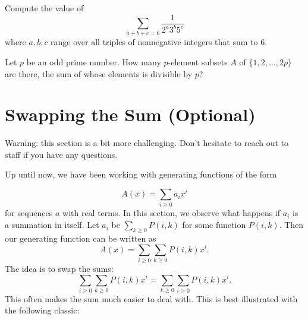 \documentclass{article}
\begin{document}
\begin{prob}[NYCMT 2020]{13}
Compute the value of
\[\sum_{a+b+c=6}\frac{1}{2^a3^b5^c}\]
where $a,b,c$ range over all triples of nonnegative integers that sum to $6.$
\end{prob}

\begin{prob}[IMO 1995/6]{13}
Let $p$ be an odd prime number. How many $p$-element subsets $A$ of $\{1,2,\dots,2p\}$ are there, the sum of whose elements is divisible by $p$?
\end{prob}

\newpage

\section{Swapping the Sum (Optional)}

Warning: this section is a bit more challenging. Don't hesitate to reach out to staff if you have any questions.

\vspace{4mm}

Up until now, we have been working with generating functions of the form

\[A(x) = \sum_{i \ge 0}a_ix^i\]
for sequences $a$ with real terms. In this section, we observe what happens if $a_i$ is a summation in itself.
Let $a_i$ be $\sum_{k \ge 0} P(i, k)$ for some function $P(i, k)$. Then our generating function can be written as
\[A(x) = \sum_{i \ge 0}\sum_{k \ge 0} P(i, k)x^i.\]
The idea is to swap the sums:
\[\sum_{i \ge 0}\sum_{k \ge 0} P(i, k)x^i = \sum_{k \ge 0}\sum_{i \ge 0} P(i, k)x^i.\]
This often makes the sum much easier to deal with.
This is best illustrated with the following classic:
\end{document}
